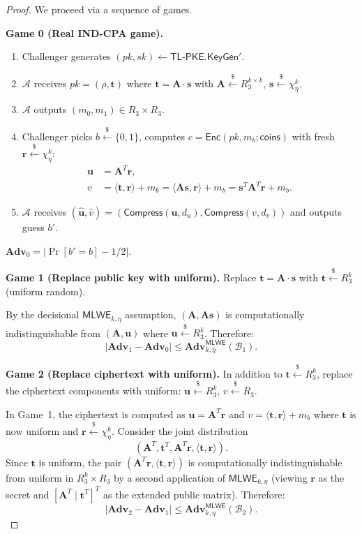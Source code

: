 \documentclass[11pt,a4paper]{article}
\theoremstyle{definition}
\newcommand{\Rq}{R_3}
\newcommand{\Adv}{\mathbf{Adv}}
\newcommand{\KeyGen}{\textsf{KeyGen}}
\newcommand{\Enc}{\textsf{Enc}}
\newcommand{\MLWE}{\textsf{MLWE}}
\newcommand{\CPAPKE}{\textsf{TL-PKE}}
\begin{document}
\begin{proof}
We proceed via a sequence of games.

\medskip
\noindent\textbf{Game 0 (Real IND-CPA game).}
\begin{enumerate}[leftmargin=2em]
  \item Challenger generates $(pk, sk) \leftarrow \CPAPKE.\KeyGen'$.
  \item $\mathcal{A}$ receives $pk = (\rho, \mathbf{t})$ where $\mathbf{t} = \mathbf{A} \cdot \mathbf{s}$ with $\mathbf{A} \xleftarrow{\$} \Rq^{k \times k}$, $\mathbf{s} \xleftarrow{\$} \chi_\eta^k$.
  \item $\mathcal{A}$ outputs $(m_0, m_1) \in \Rq \times \Rq$.
  \item Challenger picks $b \xleftarrow{\$} \{0,1\}$, computes $c = \Enc(pk, m_b; \mathsf{coins})$ with fresh $\mathbf{r} \xleftarrow{\$} \chi_\eta^k$:
    \begin{align*}
      \mathbf{u} &= \mathbf{A}^T \mathbf{r}, \\
      v &= \langle \mathbf{t}, \mathbf{r} \rangle + m_b
        = \langle \mathbf{A}\mathbf{s}, \mathbf{r} \rangle + m_b
        = \mathbf{s}^T \mathbf{A}^T \mathbf{r} + m_b.
    \end{align*}
  \item $\mathcal{A}$ receives $(\hat{\mathbf{u}}, \hat{v}) = (\textsf{Compress}(\mathbf{u}, d_u), \textsf{Compress}(v, d_v))$ and outputs guess $b'$.
\end{enumerate}
$\Adv_0 = |\Pr[b' = b] - 1/2|$.

\medskip
\noindent\textbf{Game 1 (Replace public key with uniform).}
Replace $\mathbf{t} = \mathbf{A} \cdot \mathbf{s}$ with $\mathbf{t} \xleftarrow{\$} \Rq^k$ (uniform random).

By the decisional $\MLWE_{k,\eta}$ assumption, $(\mathbf{A}, \mathbf{A}\mathbf{s})$ is computationally indistinguishable from $(\mathbf{A}, \mathbf{u})$ where $\mathbf{u} \xleftarrow{\$} \Rq^k$. Therefore:
\[
  |\Adv_1 - \Adv_0| \leq \Adv^{\MLWE}_{k,\eta}(\mathcal{B}_1).
\]

\medskip
\noindent\textbf{Game 2 (Replace ciphertext with uniform).}
In addition to $\mathbf{t} \xleftarrow{\$} \Rq^k$, replace the ciphertext components with uniform: $\mathbf{u} \xleftarrow{\$} \Rq^k$, $v \xleftarrow{\$} \Rq$.

In Game~1, the ciphertext is computed as $\mathbf{u} = \mathbf{A}^T \mathbf{r}$ and $v = \langle \mathbf{t}, \mathbf{r} \rangle + m_b$ where $\mathbf{t}$ is now uniform and $\mathbf{r} \xleftarrow{\$} \chi_\eta^k$. Consider the joint distribution
\[
  (\mathbf{A}^T, \mathbf{t}^T, \mathbf{A}^T \mathbf{r},
   \langle \mathbf{t}, \mathbf{r} \rangle).
\]
Since $\mathbf{t}$ is uniform, the pair $(\mathbf{A}^T \mathbf{r}, \langle \mathbf{t}, \mathbf{r} \rangle)$ is computationally indistinguishable from uniform in $\Rq^k \times \Rq$ by a second application of $\MLWE_{k,\eta}$ (viewing $\mathbf{r}$ as the secret and $[\mathbf{A}^T \mid \mathbf{t}^T]^T$ as the extended public matrix). Therefore:
\[
  |\Adv_2 - \Adv_1| \leq \Adv^{\MLWE}_{k,\eta}(\mathcal{B}_2).
\]


\end{proof}
\end{document}
